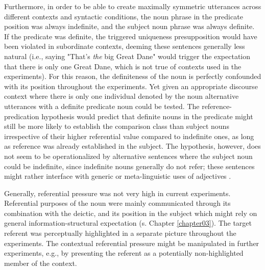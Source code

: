 Furthermore, in order to be able to create maximally symmetric utterances across different contexts and syntactic conditions, the noun phrase in the predicate position was always indefinite, and the subject noun phrase was always definite. If the predicate was definite, the triggered uniqueness presupposition would have been violated in subordinate contexts, deeming these sentences generally less natural (i.e., saying "That's \emph{the} big Great Dane" would trigger the expectation that there is only one Great Dane, which is not true of contexts used in the experiments). 
For this reason, the definiteness of the noun is perfectly confounded with its position throughout the experiments. Yet given an appropriate discourse context where there is only one individual denoted by the noun alternative utterances with a definite predicate noun could be tested. The reference-predication hypothesis would predict that definite nouns in the predicate might still be more likely to establish the comparison class than subject nouns irrespective of their higher referential value compared to indefinite ones, as long as reference was already established in the subject. 
The hypothesis, however, does not seem to be operationalized by alternative sentences where the subject noun could be indefinite, since indefinite nouns generally do not refer; these sentences might rather interface with generic or meta-linguistic uses of adjectives \parencite{Reboul2001, tessler2019language, barker2002dynamics}. 

Generally, referential pressure was not very high in current experiments. Referential purposes of the noun were mainly communicated through its combination with the deictic, and its position in the subject which might rely on general information-structural expectation (s. Chapter \ref{chapter03}). The target referent was perceptually highlighted in a separate picture throughout the experiments. The contextual referential pressure might be manipulated in further experiments, e.g., by presenting the referent as a potentially non-highlighted member of the context. 

